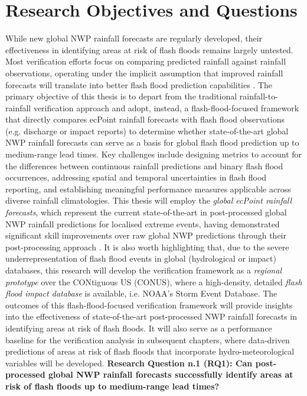 \section{Research Objectives and Questions}
\label{general_introduction_research_objectives_questions}

While  new global NWP rainfall forecasts are regularly developed, their effectiveness in identifying areas at risk of flash floods remains largely untested. Most verification efforts focus on comparing predicted rainfall against rainfall observations, operating under the implicit assumption that improved rainfall forecasts will translate into better flash flood prediction capabilities \citep{Gascón_2024}. The primary objective of this thesis is to depart from the traditional rainfall-to-rainfall verification approach and adopt, instead, a flash-flood-focused framework that directly compares ecPoint rainfall forecasts with flash flood observations (e.g. discharge or impact reports) to determine whether state-of-the-art global NWP rainfall forecasts can serve as a basis for global flash flood prediction up to medium-range lead times. Key challenges include designing metrics to account for the differences between continuous rainfall predictions and binary flash flood occurrences, addressing spatial and temporal uncertainties in flash flood reporting, and establishing meaningful performance measures applicable across diverse rainfall climatologies. This thesis will employ the \textit{global ecPoint rainfall forecasts}, which represent the current state-of-the-art in post-processed global NWP rainfall predictions for localised extreme events, having demonstrated significant skill improvements over raw global NWP predictions through their post-processing approach \citep{Hewson_2021}. It is also worth highlighting that, due to the severe underrepresentation of flash flood events in global (hydrological or impact) databases, this research will develop the verification framework as a \textit{regional prototype} over the CONtiguous US (CONUS), where a high-density, detailed \textit{flash flood impact database} is available, i.e. NOAA's Storm Event Database. The outcomes of this flash-flood-focused verification framework will provide insights into the effectiveness of state-of-the-art post-processed NWP rainfall forecasts in identifying areas at risk of flash floods. It will also serve as a performance baseline for the verification analysis in subsequent chapters, where data-driven predictions of areas at risk of flash floods that incorporate hydro-meteorological variables will be developed. \textbf{Research Question n.1 (RQ1): Can post-processed global NWP rainfall forecasts successfully identify areas at risk of flash floods up to medium-range lead times?}

